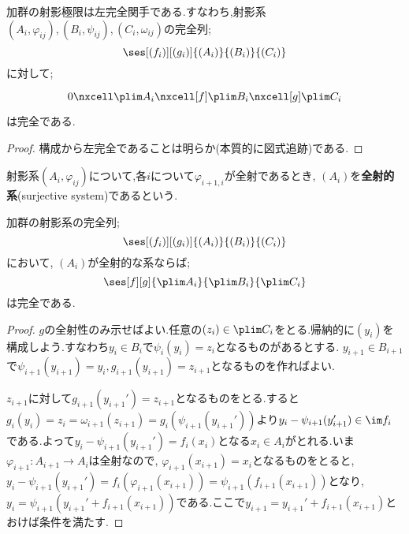 \begin{prop}
	加群の射影極限は左完全関手である.すなわち,射影系$(A_i,\varphi_{ij}),(B_i,\psi_{ij}),(C_i,\omega_{ij})$の完全列;
	\[\ses[(f_i)][(g_i)]{(A_i)}{(B_i)}{(C_i)}\]
	に対して;
	\[\begin{tikzcd}
	0\nxcell \plim A_i\nxcell[f]\plim B_i\nxcell[g]\plim C_i
	\end{tikzcd}\]
	は完全である.
\end{prop}

\begin{proof}
	構成から左完全であることは明らか(本質的に図式追跡)である.
\end{proof}

\begin{defi}[全射的系]
	射影系$(A_i,\varphi_{ij})$について,各$i$について$\varphi_{i+1,i}$が全射であるとき, $(A_i)$を\textbf{全射的系}(surjective system)であるという.
\end{defi}

\begin{thm}\label{thm:最初がsurjectiveなら射影極限は完全}
	加群の射影系の完全列;
	\[\ses[(f_i)][(g_i)]{(A_i)}{(B_i)}{(C_i)}\]
	において, $(A_i)$が全射的な系ならば;
	\[\ses[f][g]{\plim A_i}{\plim B_i}{\plim C_i}\]
	は完全である.
\end{thm}

\begin{proof}
	$g$の全射性のみ示せばよい.任意の$(z_i)\in\plim C_i$をとる.帰納的に$(y_i)$を構成しよう.すなわち$y_i\in B_i$で$\psi_i(y_i)=z_i$となるものがあるとする. $y_{i+1}\in B_{i+1}$で$\psi_{i+1}(y_{i+1})=y_i,g_{i+1}(y_{i+1})=z_{i+1}$となるものを作ればよい.
	
	$z_{i+1}$に対して$g_{i+1}(y_{i+1}')=z_{i+1}$となるものをとる.すると$g_i(y_i)=z_i=\omega_{i+1}(z_{i+1})=g_i(\psi_{i+1}(y_{i+1}'))$より$y_i-\psi_{i+1}(y_{i+1}')\in\im f_i$である.よって$y_i-\psi_{i+1}(y_{i+1}')=f_i(x_i)$となる$x_i\in A_i$がとれる.いま$\varphi_{i+1}:A_{i+1}\to A_i$は全射なので, $\varphi_{i+1}(x_{i+1})=x_i$となるものをとると, $y_i-\psi_{i+1}(y_{i+1}')=f_i(\varphi_{i+1}(x_{i+1}))=\psi_{i+1}(f_{i+1}(x_{i+1}))$となり, $y_i=\psi_{i+1}(y_{i+1}'+f_{i+1}(x_{i+1}))$である.ここで$y_{i+1}=y_{i+1}'+f_{i+1}(x_{i+1})$とおけば条件を満たす.
\end{proof}